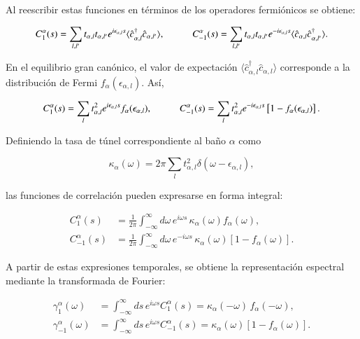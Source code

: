 \begin{appendixs}
Al reescribir estas funciones en términos de los operadores fermiónicos se obtiene:

\begin{equation*}
    C_{1}^{\alpha}(s) = \sum_{l,l'} t_{\alpha,l}t_{\alpha,l'} e^{i\epsilon_{\alpha,l}s} 
    \langle \hat{c}^{\dagger}_{\alpha,l}\hat{c}_{\alpha,l'} \rangle, 
    \hspace{10mm} 
    C^{\alpha}_{-1}(s) = \sum_{l,l'} t_{\alpha,l}t_{\alpha,l'} e^{-i\epsilon_{\alpha,l}s} 
    \langle \hat{c}_{\alpha,l}\hat{c}^{\dagger}_{\alpha,l'} \rangle.
\end{equation*}

En el equilibrio gran canónico, el valor de expectación $\langle \hat{c}^{\dagger}_{\alpha,l}\hat{c}_{\alpha,l}\rangle$ corresponde a la distribución de Fermi $f_{\alpha}(\epsilon_{\alpha,l})$. Así,

\begin{equation*}
    C_{1}^{\alpha}(s) = \sum_{l} t^{2}_{\alpha,l} e^{i\epsilon_{\alpha,l}s} f_{\alpha}(\epsilon_{\alpha,l}), 
    \hspace{10mm} 
    C^{\alpha}_{-1}(s) = \sum_{l} t^{2}_{\alpha,l} e^{-i\epsilon_{\alpha,l}s} \left[1-f_{\alpha}(\epsilon_{\alpha,l})\right].
\end{equation*}

Definiendo la tasa de túnel correspondiente al baño $\alpha$ como

\begin{equation*}
    \kappa_{\alpha}(\omega) = 2\pi \sum_{l} t_{\alpha,l}^{2} \delta(\omega - \epsilon_{\alpha,l}),
\end{equation*}

las funciones de correlación pueden expresarse en forma integral:

\begin{align*}
    C_{1}^{\alpha}(s) &= \frac{1}{2\pi} \int_{-\infty}^{\infty} d\omega\, e^{i\omega s}\, \kappa_{\alpha}(\omega) f_{\alpha}(\omega), \\
    C_{-1}^{\alpha}(s) &= \frac{1}{2\pi} \int_{-\infty}^{\infty} d\omega\, e^{-i\omega s}\, \kappa_{\alpha}(\omega)\left[1 - f_{\alpha}(\omega)\right].
\end{align*}

A partir de estas expresiones temporales, se obtiene la representación espectral mediante la transformada de Fourier:

\begin{align*}
    \gamma_{1}^{\alpha}(\omega) &= \int_{-\infty}^{\infty} ds\, e^{i \omega s} C_{1}^{\alpha}(s) 
    = \kappa_{\alpha}(-\omega)\, f_{\alpha}(-\omega), \\
    \gamma_{-1}^{\alpha}(\omega) &= \int_{-\infty}^{\infty} ds\, e^{i \omega s} C_{-1}^{\alpha}(s) 
    = \kappa_{\alpha}(\omega)\left[1 - f_{\alpha}(\omega)\right].
\end{align*}


\end{appendixs}
